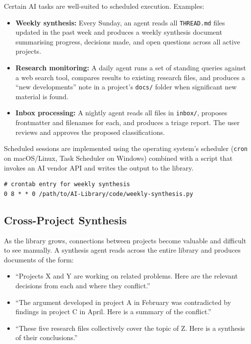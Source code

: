 \documentclass[12pt,letterpaper]{article}
\begin{document}
Certain AI tasks are well-suited to scheduled execution. Examples:

\begin{itemize}
  \item \textbf{Weekly synthesis:} Every Sunday, an agent reads all
        \texttt{THREAD.md} files updated in the past week and produces
        a weekly synthesis document summarising progress, decisions
        made, and open questions across all active projects.
  \item \textbf{Research monitoring:} A daily agent runs a set of
        standing queries against a web search tool, compares results
        to existing research files, and produces a ``new developments''
        note in a project's \texttt{docs/} folder when significant new
        material is found.
  \item \textbf{Inbox processing:} A nightly agent reads all files in
        \texttt{inbox/}, proposes frontmatter and filenames for each,
        and produces a triage report. The user reviews and approves
        the proposed classifications.
\end{itemize}

Scheduled sessions are implemented using the operating system's
scheduler (\texttt{cron} on macOS/Linux, Task Scheduler on Windows)
combined with a script that invokes an AI vendor API and writes the
output to the library.

\begin{lstlisting}
# crontab entry for weekly synthesis
0 8 * * 0 /path/to/AI-Library/code/weekly-synthesis.py
\end{lstlisting}

\subsection{Cross-Project Synthesis}

As the library grows, connections between projects become valuable and
difficult to see manually. A synthesis agent reads across the entire
library and produces documents of the form:

\begin{itemize}
  \item ``Projects X and Y are working on related problems.
        Here are the relevant decisions from each and where they conflict.''
  \item ``The argument developed in project A in February was
        contradicted by findings in project C in April.
        Here is a summary of the conflict.''
  \item ``These five research files collectively cover the topic of Z.
        Here is a synthesis of their conclusions.''
\end{itemize}
\end{document}
